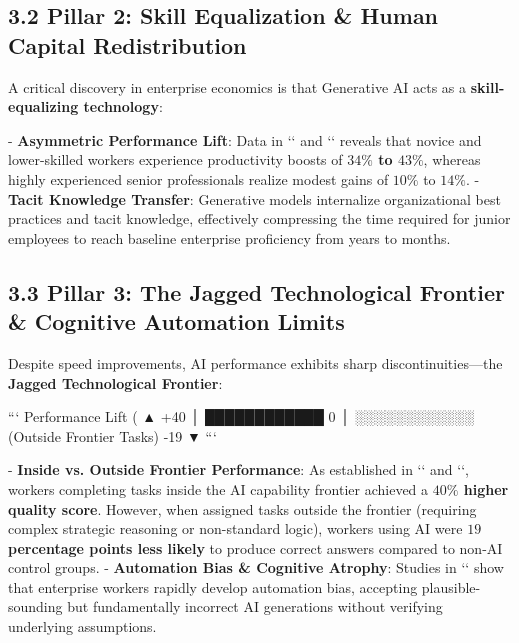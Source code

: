\documentclass[10pt,journal,compsoc,twocolumn]{IEEEtran}
\begin{document}
\subsection{3.2 Pillar 2: Skill Equalization & Human Capital Redistribution}
A critical discovery in enterprise economics is that Generative AI acts as a \textbf{skill-equalizing technology}:

- \textbf{Asymmetric Performance Lift}: Data in `\cite{openalex_W4360620450}` and `\cite{crossref_10.2139_ssrn.6685720}` reveals that novice and lower-skilled workers experience productivity boosts of \textbf{$34\%$ to $43\%$}, whereas highly experienced senior professionals realize modest gains of $10\%$ to $14\%$.
- \textbf{Tacit Knowledge Transfer}: Generative models internalize organizational best practices and tacit knowledge, effectively compressing the time required for junior employees to reach baseline enterprise proficiency from years to months.

\subsection{3.3 Pillar 3: The Jagged Technological Frontier & Cognitive Automation Limits}
Despite speed improvements, AI performance exhibits sharp discontinuities—the \textbf{Jagged Technological Frontier}:

```
  Performance Lift (%
       ▲
   +40%
       │          ████████████
     0%
       │                      ░░░░░░░░░░░░ (Outside Frontier Tasks)
   -19%
       ▼
```

- \textbf{Inside vs. Outside Frontier Performance}: As established in `\cite{crossref_10.2139_ssrn.5260645}` and `\cite{plos_10.1371_journal.pone.0340964}`, workers completing tasks inside the AI capability frontier achieved a \textbf{$40\%$ higher quality score}. However, when assigned tasks outside the frontier (requiring complex strategic reasoning or non-standard logic), workers using AI were \textbf{$19$ percentage points less likely} to produce correct answers compared to non-AI control groups.
- \textbf{Automation Bias & Cognitive Atrophy}: Studies in `\cite{pubmed_42469550}` show that enterprise workers rapidly develop automation bias, accepting plausible-sounding but fundamentally incorrect AI generations without verifying underlying assumptions.
\end{document}
